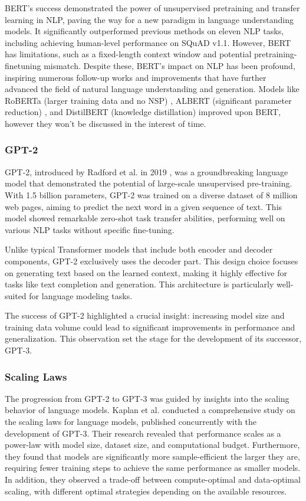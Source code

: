 \documentclass[a4paper, oneside]{discothesis}
\begin{document}
BERT's success demonstrated the power of unsupervised pretraining and transfer learning in NLP, paving the way for a new paradigm in language understanding models. 
It significantly outperformed previous methods on eleven NLP tasks, including achieving human-level performance on SQuAD v1.1. 
However, BERT has limitations, such as a fixed-length context window and potential pretraining-finetuning mismatch. 
Despite these, BERT's impact on NLP has been profound, inspiring numerous follow-up works and improvements that have further advanced the field of natural language understanding and generation.
Models like RoBERTa (larger training data and no NSP) \cite{liu2019roberta}, ALBERT (significant parameter reduction) \cite{lan2019albert}, and DistilBERT (knowledge distillation) \cite{sanh2019distilbert} improved upon BERT, however they won't be discussed in the interest of time. 



\subsubsection{GPT-2}
GPT-2, introduced by Radford et al. in 2019 \cite{radford2019language}, was a groundbreaking language model that demonstrated the potential of large-scale unsupervised pre-training. With 1.5 billion parameters, GPT-2 was trained on a diverse dataset of 8 million web pages, aiming to predict the next word in a given sequence of text. This model showed remarkable zero-shot task transfer abilities, performing well on various NLP tasks without specific fine-tuning.

Unlike typical Transformer models that include both encoder and decoder components, GPT-2 exclusively uses the decoder part. This design choice focuses on generating text based on the learned context, making it highly effective for tasks like text completion and generation. This architecture is particularly well-suited for language modeling tasks.

The success of GPT-2 highlighted a crucial insight: increasing model size and training data volume could lead to significant improvements in performance and generalization. 
This observation set the stage for the development of its successor, GPT-3.

\subsubsection{Scaling Laws}
The progression from GPT-2 to GPT-3 was guided by insights into the scaling behavior of language models. Kaplan et al. \cite{kaplan2020scaling} conducted a comprehensive study on the scaling laws for language models, published concurrently with the development of GPT-3. Their research revealed that performance scales as a power-law with model size, dataset size, and computational budget. Furthermore, they found that models are significantly more sample-efficient the larger they are, requiring fewer training steps to achieve the same performance as smaller models. In addition, they observed a trade-off between compute-optimal and data-optimal scaling, with different optimal strategies depending on the available resources.
\end{document}
